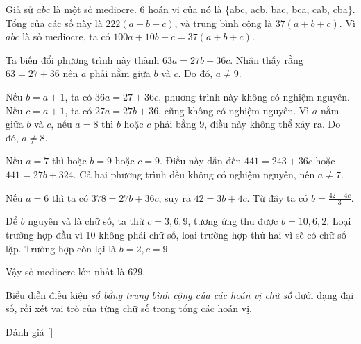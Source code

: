 \ifshowproblemandsoln
\ifshowproblem{}
\fi

\ifshowsoln
\begin{soln}\footnotemark
    Giả sử \( abc \) là một số mediocre. 6 hoán vị của nó là \{abc, acb, bac, bca, cab, cba\}. Tổng
    của các số này là \( 222(a + b + c) \), và trung bình cộng là \( 37(a + b + c) \). Vì \( abc \) là số mediocre,
    ta có \( 100a + 10b + c = 37(a + b + c) \).

    Ta biến đổi phương trình này thành \( 63a = 27b + 36c \). Nhận thấy rằng \( 63 = 27 + 36 \) nên
    \( a \) phải nằm giữa \( b \) và \( c \). Do đó, \( a \ne 9 \).

    Nếu \( b = a + 1 \), ta có \( 36a = 27 + 36c \), phương trình này không có nghiệm nguyên.
	Nếu \( c = a + 1 \), ta có \( 27a = 27b + 36 \), cũng không có nghiệm nguyên.
	Vì \( a \) nằm giữa \( b \) và \( c \), nếu \( a = 8 \) thì \( b \) hoặc \( c \) phải bằng 9, điều này không thể xảy ra. Do đó, \( a \ne 8 \).

    Nếu \( a = 7 \) thì hoặc \( b = 9 \) hoặc \( c = 9 \). Điều này dẫn đến \( 441 = 243 + 36c \) hoặc \( 441 = 27b + 324 \).
    Cả hai phương trình đều không có nghiệm nguyên, nên \( a \ne 7 \).

    Nếu \( a = 6 \) thì ta có \( 378 = 27b + 36c \), suy ra \( 42 = 3b + 4c \). Từ đây ta có \( b = \frac{42 - 4c}{3} \).

    Để \( b \) nguyên và là chữ số, ta thử \( c = 3, 6, 9 \), tương ứng thu được \( b = 10, 6, 2 \).
	Loại trường hợp đầu vì 10 không phải chữ số, loại trường hợp thứ hai vì sẽ có chữ số lặp. Trường hợp còn lại là \( b = 2, c = 9 \).

    Vậy số mediocre lớn nhất là \( \boxed{629} \).
\end{soln}
\fi

\ifshowhint
\begin{hint*}
	Biểu diễn điều kiện \textit{số bằng trung bình cộng của các hoán vị chữ số} dưới dạng đại số, rồi xét vai trò của từng chữ số trong tổng các hoán vị.
\end{hint*}
\fi

\ifshowremark
\begin{remark*}
    Đánh giá [\textbf{}]
\end{remark*}
\newpage
\fi